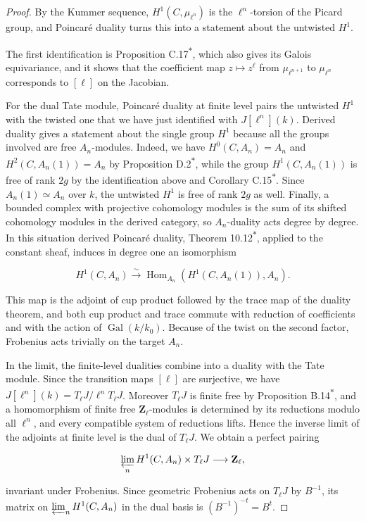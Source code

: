 \documentclass[11pt]{article}
\newcommand{\bpout}[1]{#1\textsuperscript{\hyperlink{bp-outside}{\ensuremath{\ast}}}}
\providecommand{\Hom}{}\renewcommand{\Hom}{\operatorname{Hom}}
\begin{document}
\begin{proof}[{Proof}]\label{bp11}%
By the Kummer sequence, \(H^1(C,\mu_{\ell^n})\) is the \(\ell^n\)-torsion of the Picard group, and Poincaré duality turns this into a statement about the untwisted \(H^1\).

The first identification is Proposition \bpout{C.17}, which also gives its Galois equivariance, and it shows that the coefficient map \(z\mapsto z^\ell\) from \(\mu_{\ell^{n+1}}\) to \(\mu_{\ell^n}\) corresponds to \([\ell]\) on the Jacobian.

For the dual Tate module, Poincaré duality at finite level pairs the untwisted \(H^1\) with the twisted one that we have just identified with \(J[\ell^n](k)\). Derived duality gives a statement about the single group \(H^1\) because all the groups involved are free \(A_n\)-modules. Indeed, we have \(H^0(C,A_n)=A_n\) and \(H^2(C,A_n(1))=A_n\) by Proposition \bpout{D.2}, while the group \(H^1(C,A_n(1))\) is free of rank \(2g\) by the identification above and Corollary \bpout{C.15}. Since \(A_n(1)\simeq A_n\) over \(k\), the untwisted \(H^1\) is free of rank \(2g\) as well. Finally, a bounded complex with projective cohomology modules is the sum of its shifted cohomology modules in the derived category, so \(A_n\)-duality acts degree by degree. In this situation derived Poincaré duality, Theorem \bpout{10.12}, applied to the constant sheaf, induces in degree one an isomorphism

\[
H^1(C,A_n)\xrightarrow{\sim}
\Hom_{A_n}(H^1(C,A_n(1)),A_n).
\]

This map is the adjoint of cup product followed by the trace map of the duality theorem, and both cup product and trace commute with reduction of coefficients and with the action of \(\operatorname{Gal}(k/k_0)\).  Because of the twist on the second factor, Frobenius acts trivially on the target \(A_n\).

In the limit, the finite-level dualities combine into a duality with the Tate module. Since the transition maps \([\ell]\) are surjective, we have \(J[\ell^n](k)=T_\ell J/\ell^nT_\ell J\). Moreover \(T_\ell J\) is finite free by Proposition \bpout{B.14}, and a homomorphism of finite free \(\mathbf Z_\ell\)-modules is determined by its reductions modulo all \(\ell^n\), and every compatible system of reductions lifts. Hence the inverse limit of the adjoints at finite level is the dual of \(T_\ell J\). We obtain a perfect pairing

\[
\varprojlim_nH^1(C,A_n)\times T_\ell J\longrightarrow\mathbf Z_\ell,
\]

invariant under Frobenius.  Since geometric Frobenius acts on \(T_\ell J\) by \(B^{-1}\), its matrix on \(\varprojlim_nH^1(C,A_n)\) in the dual basis is \((B^{-1})^{-t}=B^t\).
\end{proof}
\end{document}
